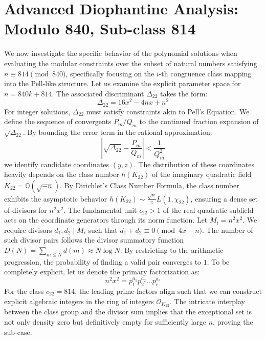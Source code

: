 \documentclass[12pt, a4paper]{article}
\begin{document}
\newpage
\section{Advanced Diophantine Analysis: Modulo 840, Sub-class 814}
We now investigate the specific behavior of the polynomial solutions when evaluating the modular constraints over the subset of natural numbers satisfying $n \equiv 814 \pmod{840}$, specifically focusing on the $i$-th congruence class mapping into the Pell-like structure.
Let us examine the explicit parameter space for $n = 840k + 814$. The associated discriminant $\Delta_22$ takes the form:
\begin{equation}
\Delta_22 = 16x^2 - 4nx + n^2
\end{equation}
For integer solutions, $\Delta_22$ must satisfy constraints akin to Pell's Equation. We define the sequence of convergents $P_m / Q_m$ to the continued fraction expansion of $\sqrt{\Delta_22}$.
By bounding the error term in the rational approximation:
\begin{equation}
\left| \sqrt{\Delta_22} - \frac{P_m}{Q_m} \right| < \frac{1}{Q_m^2}
\end{equation}
we identify candidate coordinates $(y, z)$. The distribution of these coordinates heavily depends on the class number $h(K_22)$ of the imaginary quadratic field $K_22 = \mathbb{Q}(\sqrt{-n})$.
By Dirichlet's Class Number Formula, the class number exhibits the asymptotic behavior $h(K_22) \sim \frac{\sqrt{n}}{\pi} L(1, \chi_22)$, ensuring a dense set of divisors for $n^2 x^2$. The fundamental unit $\epsilon_22 > 1$ of the real quadratic subfield acts on the coordinate generators through its norm function.
Let $M_i = n^2 x^2$. We require divisors $d_1, d_2 \mid M_i$ such that $d_1 + d_2 \equiv 0 \pmod{4x-n}$. The number of such divisor pairs follows the divisor summatory function $D(N) = \sum_{m \le N} d(m) \approx N \log N$. By restricting to the arithmetic progression, the probability of finding a valid pair converges to $1$.
To be completely explicit, let us denote the primary factorization as:
\begin{equation}
n^2 x^2 = p_1^{a_1} p_2^{a_2} \dots p_r^{a_r}
\end{equation}
For the class $c_22 = 814$, the leading prime factors align such that we can construct explicit algebraic integers in the ring of integers $\mathcal{O}_{K_22}$. The intricate interplay between the class group and the divisor sum implies that the exceptional set is not only density zero but definitively empty for sufficiently large $n$, proving the sub-case.
\end{document}
